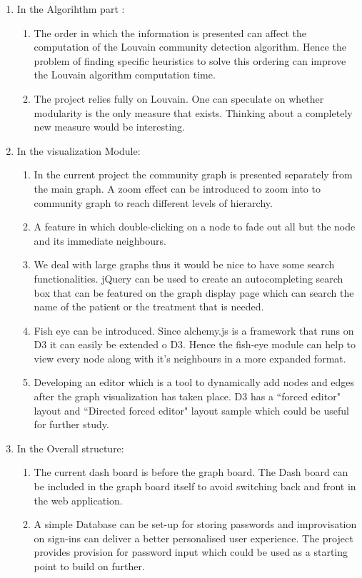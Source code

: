 \begin{enumerate}
\item In the Algorihthm part :
\begin{enumerate}
\item The order in which the information is presented can affect the computation of the Louvain community detection algorithm. Hence the problem of finding specific heuristics to solve this ordering can improve the Louvain algorithm computation time.
\item 
The project relies fully on Louvain. One can speculate on whether modularity is the only measure that exists. Thinking about a completely new measure would be interesting. 
\end{enumerate}

\item In the visualization Module:
\begin{enumerate}
\item In the current project the community graph is presented separately from the main graph.  A zoom effect can be introduced to zoom into to community graph to reach different levels of hierarchy. 
\item  A feature in which double-clicking on a node to fade out all but the node and its immediate neighbours.
\item We deal with large graphs thus it would be nice to have some search functionalities. jQuery can be used to create an autocompleting search box that can be featured on the graph display page which can search the name of the patient or the treatment that is needed. 
\item Fish eye can be introduced. Since alchemy.js is a framework that runs on D3 it can easily be extended o D3. Hence the fish-eye module can help to view every node along  with it's neighbours in a more expanded format.
\item Developing an editor which is a tool to dynamically add nodes and edges after the graph visualization has taken place. D3 has a ``forced editor" layout and ``Directed forced editor" layout sample which could be useful for further study.
\end{enumerate}
\item In the Overall structure:
\begin{enumerate}
\item The current dash board is before the graph board. The Dash board can be included in the graph board itself to avoid switching back and front in the web application.
\item  A simple Database can be set-up for storing passwords and improvisation on sign-ins can deliver a better personalised user experience. The project provides provision for password input which could be used as a starting point to build on further. 
\end{enumerate}
\end{enumerate}
